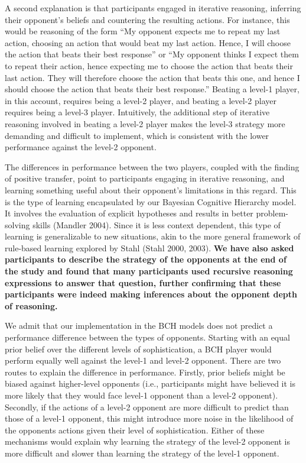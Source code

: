 \documentclass[smallextended]{svjour3}       %
\begin{document}
A second explanation is that participants engaged in iterative
reasoning, inferring their opponent's beliefs and countering the
resulting actions. For instance, this would be reasoning of the form
``My opponent expects me to repeat my last action, choosing an action
that would beat my last action. Hence, I will choose the action that
beats their best response'' or ``My opponent thinks I expect them to
repeat their action, hence expecting me to choose the action that beats
their last action. They will therefore choose the action that beats this
one, and hence I should choose the action that beats their best
response.'' Beating a level-1 player, in this account, requires being a
level-2 player, and beating a level-2 player requires being a level-3
player. Intuitively, the additional step of iterative reasoning involved
in beating a level-2 player makes the level-3 strategy more demanding
and difficult to implement, which is consistent with the lower
performance against the level-2 opponent.

The differences in performance between the two players, coupled with the
finding of positive transfer, point to participants engaging in
iterative reasoning, and learning something useful about their
opponent's limitations in this regard. This is the type of learning
encapsulated by our Bayesian Cognitive Hierarchy model. It involves the
evaluation of explicit hypotheses and results in better problem-solving
skills (Mandler 2004). Since it is less context dependent, this type of
learning is generalizable to new situations, akin to the more general
framework of rule-based learning explored by Stahl (Stahl 2000, 2003).
\textbf{We have also asked participants to describe the strategy of the
opponents at the end of the study and found that many participants used
recursive reasoning expressions to answer that question, further
confirming that these participants were indeed making inferences about
the opponent depth of reasoning.}

We admit that our implementation in the BCH models does not predict a
performance difference between the types of opponents. Starting with an
equal prior belief over the different levels of sophistication, a BCH
player would perform equally well against the level-1 and level-2
opponent. There are two routes to explain the difference in performance.
Firstly, prior beliefs might be biased against higher-level opponents
(i.e., participants might have believed it is more likely that they
would face level-1 opponent than a level-2 opponent). Secondly, if the
actions of a level-2 opponent are more difficult to predict than those
of a level-1 opponent, this might introduce more noise in the likelihood
of the opponents actions given their level of sophistication. Either of
these mechanisms would explain why learning the strategy of the level-2
opponent is more difficult and slower than learning the strategy of the
level-1 opponent.
\end{document}
